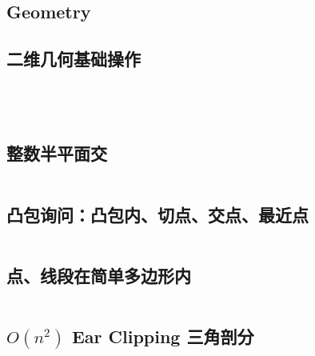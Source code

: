 \documentclass[titlepage, a4paper, 11pt]{article}
\begin{document}
	\begin{titlepage}
		
	\end{titlepage}
		\setcounter{tocdepth}{3}
		\begingroup
		\let\cleardoublepage\relax
		\let\clearpage\relax
		\tableofcontents
		\newpage
		\begin{spacing}{1.15}
			
			\section{Geometry}
				\subsection{二维几何基础操作}
					\inputminted{cpp}{src/Geometry/凸包.cpp}
					\inputminted{cpp}{src/Geometry/闵可夫斯基和.cpp}
					\inputminted{cpp}{src/Geometry/geo.cpp}
					\inputminted{cpp}{src/Geometry/半平面交.cpp}
				\subsection{整数半平面交}
					\inputminted{cpp}{src/Geometry/integral_hpi.cpp}
				\subsection{凸包询问：凸包内、切点、交点、最近点}
					\inputminted{cpp}{src/Geometry/convex_findmax.cpp}
				

				
				 \subsection{点、线段在简单多边形内}
					\inputminted{cpp}{src/Geometry/AirportConstruction.cpp}
				\subsection{$O(n ^ 2)$ Ear Clipping 三角剖分}
				\inputminted{cpp}{src/Geometry/Triangulation.cpp}

\end{spacing}
\end{document}
